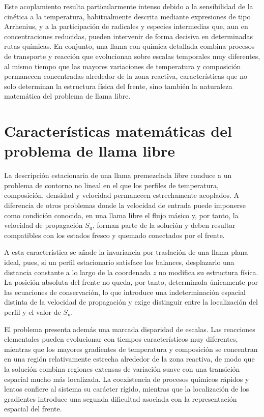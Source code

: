 \documentclass[12pt,a4paper,twoside,openany]{book}
\newcommand{\Su}{S_{\mathrm{u}}}
\begin{document}
Este acoplamiento resulta particularmente intenso debido a la sensibilidad de la
cinética a la temperatura, habitualmente descrita mediante expresiones de tipo
Arrhenius, y a la participación de radicales y especies intermedias que, aun en
concentraciones reducidas, pueden intervenir de forma decisiva en determinadas
rutas químicas. En conjunto, una llama con química detallada combina procesos de
transporte y reacción que evolucionan sobre escalas temporales muy diferentes,
al mismo tiempo que las mayores variaciones de temperatura y composición
permanecen concentradas alrededor de la zona reactiva, características que no
solo determinan la estructura física del frente, sino también la naturaleza
matemática del problema de llama libre.


\section{Características matemáticas del problema de llama libre}
\label{sec:free-flame-mathematical-character}

La descripción estacionaria de una llama premezclada libre conduce a un problema
de contorno no lineal en el que los perfiles de temperatura, composición,
densidad y velocidad permanecen estrechamente acoplados. A diferencia de otros
problemas donde la velocidad de entrada puede imponerse como condición conocida,
en una llama libre el flujo másico y, por tanto, la velocidad de propagación
\(\Su\), forman parte de la solución y deben resultar compatibles con los
estados fresco y quemado conectados por el frente.

A esta característica se añade la invariancia por traslación de una llama plana
ideal, pues, si un perfil estacionario satisface los balances, desplazarlo una
distancia constante a lo largo de la coordenada \(z\) no modifica su estructura
física. La posición absoluta del frente no queda, por tanto, determinada
únicamente por las ecuaciones de conservación, lo que introduce una
indeterminación espacial distinta de la velocidad de propagación y exige
distinguir entre la localización del perfil y el valor de \(\Su\).

El problema presenta además una marcada disparidad de escalas. Las reacciones
elementales pueden evolucionar con tiempos característicos muy diferentes,
mientras que los mayores gradientes de temperatura y composición se concentran
en una región relativamente estrecha alrededor de la zona reactiva, de modo que
la solución combina regiones extensas de variación suave con una transición
espacial mucho más localizada. La coexistencia de procesos químicos rápidos y
lentos confiere al sistema su carácter rígido, mientras que la localización de
los gradientes introduce una segunda dificultad asociada con la representación
espacial del frente.
\end{document}
